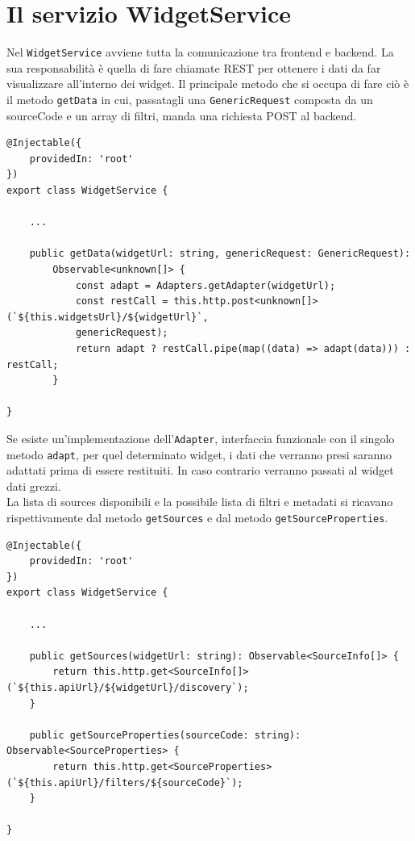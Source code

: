 \section{Il servizio WidgetService}
Nel \verb|WidgetService| avviene tutta la comunicazione tra frontend e backend.
La sua responsabilità è quella di fare chiamate REST per ottenere i dati da far visualizzare all'interno dei widget. Il principale metodo che si occupa di fare ciò è il metodo \verb|getData| in cui, passatagli una \verb|GenericRequest| composta da un sourceCode e un array di filtri, manda una richiesta POST al backend. \\
\begin{lstlisting}[caption={Metodo getData all'interno della classe WidgetService}, style=javaScriptCode]
@Injectable({
    providedIn: 'root'
})
export class WidgetService {

    ...

    public getData(widgetUrl: string, genericRequest: GenericRequest): 
        Observable<unknown[]> {
            const adapt = Adapters.getAdapter(widgetUrl);
            const restCall = this.http.post<unknown[]>(`${this.widgetsUrl}/${widgetUrl}`, 
            genericRequest);
            return adapt ? restCall.pipe(map((data) => adapt(data))) : restCall;
        }

}

\end{lstlisting}
Se esiste un'implementazione dell'\verb|Adapter|, interfaccia funzionale con il singolo metodo \verb|adapt|, per quel determinato widget, i dati che verranno presi saranno adattati prima di essere restituiti. In caso contrario verranno passati al widget dati grezzi. \\
La lista di sources disponibili e la possibile lista di filtri e metadati si ricavano rispettivamente dal metodo \verb|getSources| e dal metodo \verb|getSourceProperties|. \\
\begin{lstlisting}[caption={Metodi getSources e getSourceProperties all'interno della classe WidgetService}, style=javaScriptCode]
@Injectable({
    providedIn: 'root'
})
export class WidgetService {

    ...
        
    public getSources(widgetUrl: string): Observable<SourceInfo[]> {
        return this.http.get<SourceInfo[]>(`${this.apiUrl}/${widgetUrl}/discovery`);
    }

    public getSourceProperties(sourceCode: string): Observable<SourceProperties> {
        return this.http.get<SourceProperties>(`${this.apiUrl}/filters/${sourceCode}`);
    }

}
\end{lstlisting}

